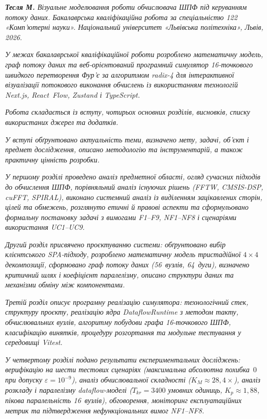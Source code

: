 \documentclass[
]{article}
\begin{document}
\emph{\textbf{Тесля М.} Візуальне моделювання роботи обчислювача ШПФ під
керуванням потоку даних. Бакалаврська кваліфікаційна робота за
спеціальністю 122 «Комп'ютерні науки». Національний університет
«Львівська політехніка», Львів, 2026.}

\emph{У межах бакалаврської кваліфікаційної роботи розроблено
математичну модель, граф потоку даних та веб-орієнтований програмний
симулятор 16-точкового швидкого перетворення Фур'є за алгоритмом radix-4
для інтерактивної візуалізації потокового виконання обчислень із
використанням технологій Next.js, React~Flow, Zustand і TypeScript.}

\emph{Робота складається із вступу, чотирьох основних розділів,
висновків, списку використаних джерел та додатків.}

\emph{У вступі обґрунтовано актуальність теми, визначено мету, задачі,
об'єкт і предмет дослідження, описано методологію та інструментарій, а
також практичну цінність розробки.}

\emph{У першому розділі проведено аналіз предметної області, огляд
сучасних підходів до обчислення ШПФ, порівняльний аналіз існуючих рішень
(FFTW, CMSIS-DSP, cuFFT, SPIRAL), виконано системний аналіз із
виділенням зацікавлених сторін, цілей та обмежень, розглянуто етичні й
правові аспекти та сформульовано формальну постановку задачі з вимогами
F1--F9, NF1--NF8 і сценаріями використання UC1--UC9.}

\emph{Другий розділ присвячено проєктуванню системи: обґрунтовано вибір
клієнтського SPA-підходу, розроблено математичну модель тристадійної}
\(4 \times 4\) \emph{декомпозиції, сформовано граф потоку даних
(56~вузлів, 64~дуги), визначено критичний шлях і коефіцієнт паралелізму,
описано структури даних та механізми обміну між компонентами.}

\emph{Третій розділ описує програмну реалізацію симулятора:
технологічний стек, структуру проєкту, реалізацію ядра DataflowRuntime з
методом такту, обчислювальних вузлів, алгоритму побудови графа
16-точкового ШПФ,
класифікацію винятків, процедуру розгортання та модульне тестування у
середовищі Vitest.}

\emph{У четвертому розділі подано результати експериментальних
досліджень: верифікацію на шести тестових сценаріях (максимальна
абсолютна похибка}~\(0\) \emph{при допуску}
\(\varepsilon = 10^{- 9}\)\emph{), аналіз обчислювальної складності
(}\(K_{M} \approx 28,4 \times\)\emph{), аналіз розкладу і паралелізму
dataflow-моделі (}\(T_{kr} = 3400\) \emph{умовних одиниць,}
\(K_{p} \approx 1,88\)\emph{, пікова паралельність 16~вузлів),
обговорення, моніторинг експлуатаційних метрик та підтвердження
нефункціональних вимог NF1--NF8.}
\end{document}
